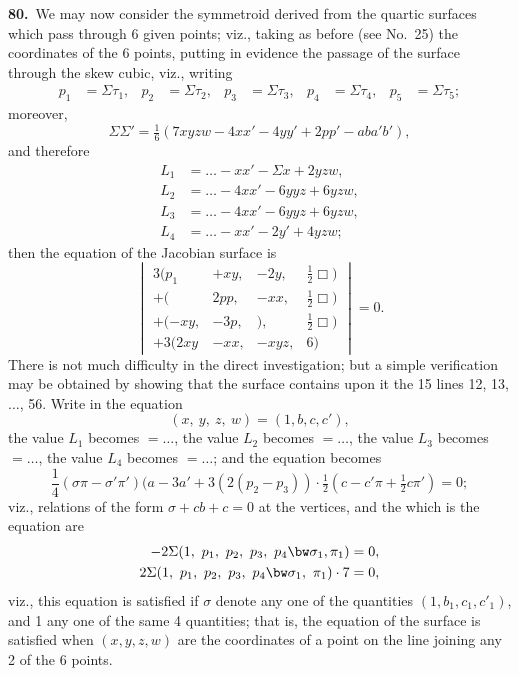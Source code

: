 \documentclass[11pt,a4paper]{article}
\begin{document}
\textbf{80.}\ We may now consider the symmetroid derived from the quartic surfaces which pass through 6 given points; viz., taking as before (see No.\ 25) the coordinates of the 6 points, putting in evidence the passage of the surface through the skew cubic, viz., writing
\begin{align*}
p_1 &= \Sigma\tau_1, & p_2 &= \Sigma\tau_2, & p_3 &= \Sigma\tau_3, & p_4 &= \Sigma\tau_4, & p_5 &= \Sigma\tau_5;
\end{align*}
moreover,
\[
\Sigma\Sigma' = \tfrac{1}{6}(7xyzw - 4xx' - 4yy' + 2pp' - aba'b'),
\]
and therefore
\begin{align*}
L_1 &= \ldots - xx' - \Sigma x + 2yzw,\\
L_2 &= \ldots - 4xx' - 6yyz + 6yzw,\\
L_3 &= \ldots - 4xx' - 6yyz + 6yzw,\\
L_4 &= \ldots - xx' - 2y' + 4yzw;
\end{align*}
then the equation of the Jacobian surface is
\[
\begin{vmatrix}
3(p_1 & + xy, & -2y, & \tfrac{1}{2}\Box)\\
+ ( & 2pp, & -xx, & \tfrac{1}{2}\Box)\\
+ (-xy, & -3p, & ), & \tfrac{1}{2}\Box)\\
+ 3(2xy & -xx, & -xyz, & 6) \end{vmatrix} = 0.
\]
There is not much difficulty in the direct investigation; but a simple verification may be obtained by showing that the surface contains upon it the 15 lines 12, 13, $\ldots$, 56. Write in the equation
\[
(x,\ y,\ z,\ w) = (1, b, c, c'),
\]
the value $L_1$ becomes $= \ldots$, the value $L_2$ becomes $= \ldots$, the value $L_3$ becomes $= \ldots$, the value $L_4$ becomes $= \ldots$; and the equation becomes
\[
\frac{1}{4}(\sigma \pi - \sigma' \pi') (a - 3a' + 3(2(p_2 - p_3)) \cdot \tfrac{1}{2}(c - c'\pi + \tfrac{1}{2}c\pi') = 0;
\]
viz., relations of the form $\sigma + cb + c = 0$ at the vertices, and the which is the equation are
\begin{align*}
-2\Sigma(1,\ p_1,\ p_2,\ p_3,\ p_4 \bw\sigma_1, \pi_1) &= 0,\\
2\Sigma(1,\ p_1,\ p_2,\ p_3,\ p_4 \bw\sigma_1,\ \pi_1)\cdot 7 &= 0,
\end{align*}
viz., this equation is satisfied if $\sigma$ denote any one of the quantities $(1, b_1, c_1, c'_1)$, and 1 any one of the same 4 quantities; that is, the equation of the surface is satisfied when $(x, y, z, w)$ are the coordinates of a point on the line joining any 2 of the 6 points.
\end{document}
